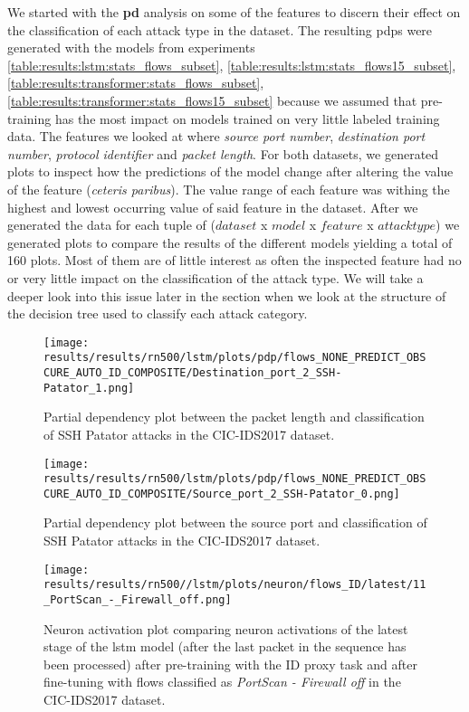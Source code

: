 We started with the \textbf{\gls{pd}} analysis on some of the features
to discern their effect on the classification of each attack type in the dataset. 
The resulting \glspl{pdp} were generated with the models from experiments \ref{table:results:lstm:stats_flows_subset},
\ref{table:results:lstm:stats_flows15_subset}, \ref{table:results:transformer:stats_flows_subset}, \ref{table:results:transformer:stats_flows15_subset} because we assumed that pre-training has the most impact on models trained on very little labeled training data. The features we looked at where \textit{source port number}, \textit{destination port number}, \textit{protocol identifier} and \textit{packet length}.
For both datasets, we generated plots to inspect how the predictions of the model change after altering the value of the feature (\textit{ceteris paribus}). The value range of each feature was withing the highest and lowest occurring value of said feature in the dataset. After we generated the data for each tuple of ($dataset$ x $model$ x $feature$ x $attack type$) we generated plots to compare the results of the different models yielding a total of 160 plots. Most of them are of little interest as often the inspected feature had no or very little impact on the classification of the attack type. We will take a deeper look into this issue later in the section when we look at the structure of the decision tree used to classify each attack category. 


\begin{figure}[!htbp]
	\centering
	\texttt{[image: results/results/rn500/lstm/plots/pdp/flows\_NONE\_PREDICT\_OBSCURE\_AUTO\_ID\_COMPOSITE/Destination\_port\_2\_SSH-Patator\_1.png]}
	\caption{Partial dependency plot between the packet length and classification of SSH Patator attacks in the CIC-IDS2017 dataset.}
	\label{fig:results:lstm:pdp:cic17_destination_port_ssh_patator}
\end{figure}

\begin{figure}[!htbp]
	\centering
	\texttt{[image: results/results/rn500/lstm/plots/pdp/flows\_NONE\_PREDICT\_OBSCURE\_AUTO\_ID\_COMPOSITE/Source\_port\_2\_SSH-Patator\_0.png]}
	\caption{Partial dependency plot between the source port and classification of SSH Patator attacks in the CIC-IDS2017 dataset.}
	\label{fig:results:lstm:pdp:cic17_source_port_ssh_patator}
\end{figure}

\begin{figure}[!htbp]
	\centering
	\texttt{[image: results/results/rn500//lstm/plots/neuron/flows\_ID/latest/11\_PortScan\_-\_Firewall\_off.png]}
	\caption{Neuron activation plot comparing neuron activations of the latest stage of the \gls{lstm} model (after the last packet in the sequence has been processed) after pre-training with the ID proxy task and after fine-tuning with flows classified as \textit{PortScan - Firewall off} in the CIC-IDS2017 dataset.}
	\label{fig:results:lstm:neuron:cic17_id_port_scan_firewall_off}
\end{figure}

